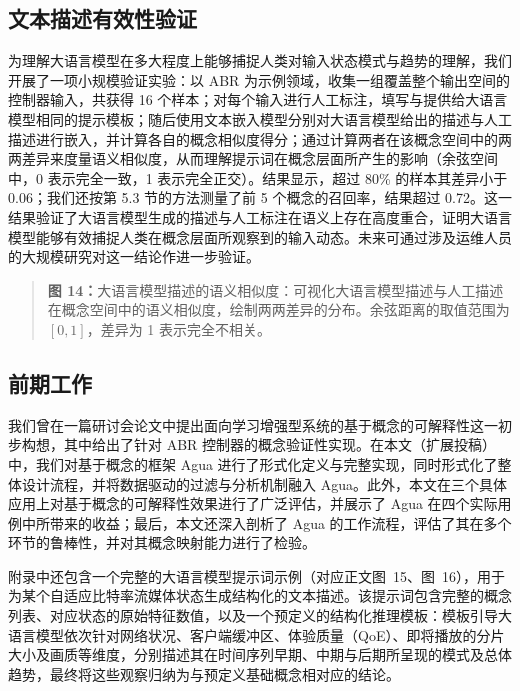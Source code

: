 \documentclass[11pt,a4paper]{article}
\begin{document}
\subsection{文本描述有效性验证}

为理解大语言模型在多大程度上能够捕捉人类对输入状态模式与趋势的理解，我们开展了一项小规模验证实验：以 ABR 为示例领域，收集一组覆盖整个输出空间的控制器输入，共获得 16 个样本；对每个输入进行人工标注，填写与提供给大语言模型相同的提示模板；随后使用文本嵌入模型分别对大语言模型给出的描述与人工描述进行嵌入，并计算各自的概念相似度得分；通过计算两者在该概念空间中的两两差异来度量语义相似度，从而理解提示词在概念层面所产生的影响（余弦空间中，0 表示完全一致，1 表示完全正交）。结果显示，超过 80\% 的样本其差异小于 0.06；我们还按第 5.3 节的方法测量了前 5 个概念的召回率，结果超过 0.72。这一结果验证了大语言模型生成的描述与人工标注在语义上存在高度重合，证明大语言模型能够有效捕捉人类在概念层面所观察到的输入动态。未来可通过涉及运维人员的大规模研究对这一结论作进一步验证。

\begin{quote}\small\noindent\textbf{图 14：}大语言模型描述的语义相似度：可视化大语言模型描述与人工描述在概念空间中的语义相似度，绘制两两差异的分布。余弦距离的取值范围为 $[0,1]$，差异为 1 表示完全不相关。\end{quote}

\subsection{前期工作}

我们曾在一篇研讨会论文中提出面向学习增强型系统的基于概念的可解释性这一初步构想，其中给出了针对 ABR 控制器的概念验证性实现。在本文（扩展投稿）中，我们对基于概念的框架 Agua 进行了形式化定义与完整实现，同时形式化了整体设计流程，并将数据驱动的过滤与分析机制融入 Agua。此外，本文在三个具体应用上对基于概念的可解释性效果进行了广泛评估，并展示了 Agua 在四个实际用例中所带来的收益；最后，本文还深入剖析了 Agua 的工作流程，评估了其在多个环节的鲁棒性，并对其概念映射能力进行了检验。

附录中还包含一个完整的大语言模型提示词示例（对应正文图~15、图~16），用于为某个自适应比特率流媒体状态生成结构化的文本描述。该提示词包含完整的概念列表、对应状态的原始特征数值，以及一个预定义的结构化推理模板：模板引导大语言模型依次针对网络状况、客户端缓冲区、体验质量（QoE）、即将播放的分片大小及画质等维度，分别描述其在时间序列早期、中期与后期所呈现的模式及总体趋势，最终将这些观察归纳为与预定义基础概念相对应的结论。
\end{document}
